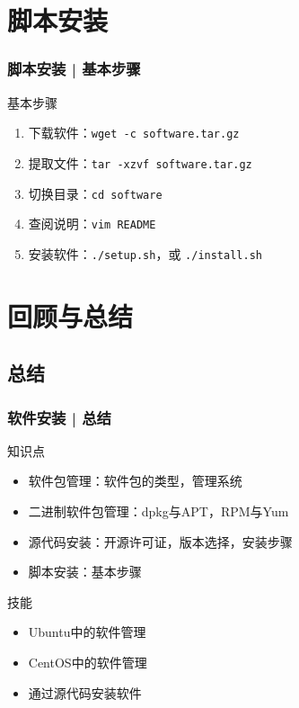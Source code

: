 \section{脚本安装}
\begin{frame}[fragile]
  \frametitle{脚本安装 | \alert{基本步骤}}
  \begin{block}{基本步骤}
    \begin{enumerate}
      \item 下载软件：\verb|wget -c software.tar.gz|
      \item 提取文件：\verb|tar -xzvf software.tar.gz|
      \item 切换目录：\verb|cd software|
      \item 查阅说明：\verb|vim README|
      \item 安装软件：\verb|./setup.sh|，或 \verb|./install.sh|
    \end{enumerate}
  \end{block}
\end{frame}

\section{回顾与总结}
\subsection{总结}
\begin{frame}
  \frametitle{软件安装 | 总结}
  \begin{block}{知识点}
    \begin{itemize}
      \item 软件包管理：软件包的类型，管理系统
      \item 二进制软件包管理：dpkg与APT，RPM与Yum
      \item 源代码安装：开源许可证，版本选择，安装步骤
      \item 脚本安装：基本步骤
    \end{itemize}
  \end{block}
  \begin{block}{技能}
    \begin{itemize}
      \item Ubuntu中的软件管理
      \item CentOS中的软件管理
      \item 通过源代码安装软件
    \end{itemize}
  \end{block}
\end{frame}

